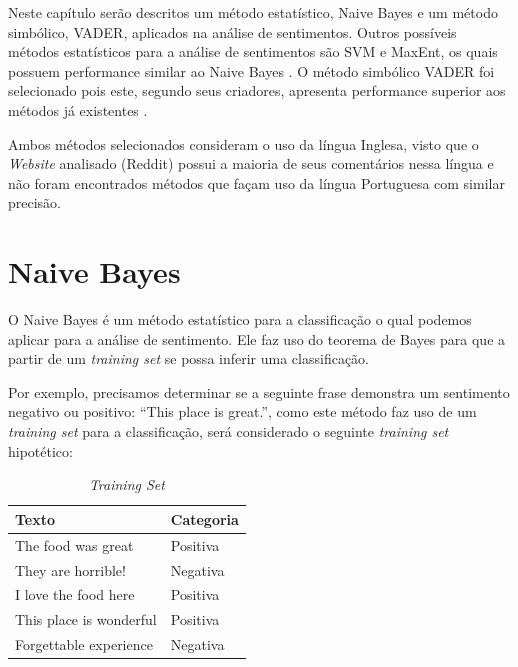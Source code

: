 Neste capítulo serão descritos um método estatístico, Naive Bayes e um método
simbólico, \ac{VADER}, aplicados na análise de sentimentos. Outros possíveis
métodos estatísticos para a análise de sentimentos são \ac{SVM} e \ac{MaxEnt},
os quais possuem performance similar ao Naive Bayes \cite{Pang:2002:TUS:1118693.1118704}. O método simbólico
\ac{VADER} foi selecionado pois este, segundo seus criadores, apresenta
performance superior aos métodos já existentes \cite{conf/icwsm/HuttoG14}.

Ambos métodos selecionados consideram o uso da língua Inglesa,
visto que o \textit{Website} analisado (Reddit) possui a maioria de seus
comentários nessa língua e não foram encontrados métodos que façam uso da língua
Portuguesa com similar precisão.





\section{Naive Bayes}

O Naive Bayes é um método estatístico para a classificação o qual podemos
aplicar para a análise de sentimento. Ele faz uso do teorema de Bayes para
que a partir de um \textit{training set} se possa inferir uma classificação.

Por exemplo, precisamos determinar se a seguinte frase demonstra um sentimento
negativo ou positivo: ``This place is great.'', como este método faz uso de um
\textit{training set} para a classificação, será considerado o seguinte \textit{training set} hipotético:

\begin{table}[htb]
\centering
\begin{tabular}{|l|l|}
\hline
Texto  & Categoria \\ \hline
The food was great  & Positiva     \\ \hline
They are horrible!    & Negativa     \\ \hline
I love the food here  & Positiva     \\ \hline
This place is wonderful  & Positiva     \\ \hline
Forgettable experience  & Negativa     \\ \hline
\end{tabular}
\caption{\textit{Training Set}}
\label{tab:trainingsetnb}
\end{table}

